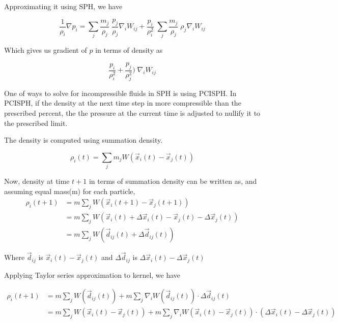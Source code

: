 Approximating it using SPH, we have

\begin{equation*}
  \frac{1}{\rho_i} \nabla p_i = \sum_j \frac{m_j}{\rho_j} \;
  \frac{p_j}{\rho_j} \nabla_i W_{ij} + \frac{p_i}{\rho_i^2} \; \sum_j
  \frac{m_j}{\rho_j} \; \rho_j \nabla_i W_{ij}
\end{equation*}

Which gives us gradient of $p$ in terms of density as


\begin{equation}
  \label{eq:df_sph}%
  \frac{p_i}{\rho_i^2} + \frac{p_j}{\rho_j^2} \bigg)\;\nabla_i W_{ij}
\end{equation}


One of ways to solve for incompressible fluids in SPH is using PCISPH. In
PCISPH, if the density at the next time step in more compressible than the
prescribed percent, the the pressure at the current time is adjusted to nullify
it to the prescribed limit.

The density is computed using summation density.

\begin{equation}
  \label{eq:summation_density}
  \rho_i(t) = \sum_j m_j W(\vec{x}_i(t) - \vec{x}_j(t))
\end{equation}

Now, density at time $t + 1$ in terms of summation density can be written as,
and assuming equal mass(m) for each particle,
\begin{align*}
  \rho_i(t+1) &= m \sum_j W(\vec{x}_i(t+1) -
                \vec{x}_j(t+1)) \\
              &= m \sum_j W(\vec{x}_i(t) + \Delta
                \vec{x}_i(t) - \vec{x}_j(t) - \Delta \vec{x}_j(t)) \\
              &= m \sum_j W(\vec{d}_{ij}(t) + \Delta \vec{d}_{ij}(t))
\end{align*}

Where $\vec{d}_{ij}$ is $\vec{x}_i(t) - \vec{x}_j(t)$ and
$\Delta \vec{d}_{ij}$ is $\Delta\vec{x}_i(t) -
\Delta\vec{x}_j(t)$


Applying Taylor series approximation to kernel, we have

\begin{align*}
  \rho_i(t+1) &= m \sum_j W(\vec{d}_{ij}(t)) + m \sum_j \nabla_i W(\vec{d}_{ij}(t)) \cdot \Delta \vec{d}_{ij}(t) \\
              &= m \sum_j W(\vec{x}_i(t) - \vec{x}_j(t)) + m \sum_j \nabla_i W(\vec{x}_i(t) -
                \vec{x}_j(t)) \cdot (\Delta\vec{x}_i(t) - \Delta\vec{x}_j(t))\\
\end{align*}

